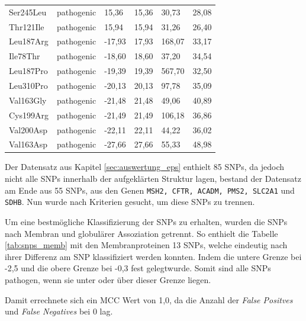 \begin{table}[]
{\begin{tabular}{llllll}
        Ser245Leu & pathogenic & 15,36 & 15,36 & 30,73 & 28,08 \\
        \rowcolor[HTML]{FFCCC9} 
        Thr121Ile & pathogenic & 15,94 & 15,94 & 31,26 & 26,40 \\
        \rowcolor[HTML]{FFCCC9} 
        Leu187Arg & pathogenic & -17,93 & 17,93 & 168,07 & 33,17 \\
        \rowcolor[HTML]{FFCCC9} 
        Ile78Thr & pathogenic & -18,60 & 18,60 & 37,20 & 34,54 \\
        \rowcolor[HTML]{FFCCC9} 
        Leu187Pro & pathogenic & -19,39 & 19,39 & 567,70 & 32,50 \\
        \rowcolor[HTML]{FFCCC9} 
        Leu310Pro & pathogenic & -20,13 & 20,13 & 97,78 & 35,09 \\
        \rowcolor[HTML]{FFCCC9} 
        Val163Gly & pathogenic & -21,48 & 21,48 & 49,06 & 40,89 \\
        \rowcolor[HTML]{FFCCC9} 
        Cys199Arg & pathogenic & -21,49 & 21,49 & 106,18 & 36,86 \\
        \rowcolor[HTML]{FFCCC9} 
        Val200Asp & pathogenic & -22,11 & 22,11 & 44,22 & 36,02 \\
        \rowcolor[HTML]{FFCCC9} 
        Val163Asp & pathogenic & -27,66 & 27,66 & 55,33 & 48,98
    \end{tabular}}
\end{table}

Der Datensatz aus Kapitel \ref{sec:auswertung_eps} enthielt 85 \ac{SNP}s, da jedoch nicht alle SNPs innerhalb der aufgeklärten Struktur lagen, bestand der Datensatz am Ende aus 55 \ac{SNP}s, aus den Genen \texttt{MSH2, CFTR, ACADM, PMS2, SLC2A1} und \texttt{SDHB}. Nun wurde nach Kriterien gesucht, um diese SNPs zu trennen. 

Um eine bestmögliche Klassifizierung der \ac{SNP}s zu erhalten, wurden die \ac{SNP}s nach Membran und globulärer Assoziation getrennt. So enthielt die Tabelle \ref{tab:snps_memb} mit den Membranproteinen 13 \ac{SNP}s, welche eindeutig nach ihrer Differenz am \ac{SNP} klassifiziert werden konnten. Indem die untere Grenze bei -2,5 und die obere Grenze bei -0,3 fest gelegtwurde. Somit sind alle \ac{SNP}s pathogen, wenn sie unter oder über dieser Grenze liegen.

Damit errechnete sich ein MCC Wert von 1,0, da die Anzahl der \emph{False Positves} und \emph{False Negatives} bei 0 lag.

